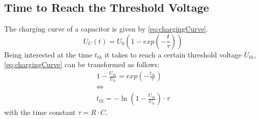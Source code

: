     \subsection{Time to Reach the Threshold Voltage}\label{sec:preparation_task_6}
        The charging curve of a capacitor is given by \cref{eq:chargingCurve}.
        \begin{equation}
            U_C(t) = U_0 \left(1-exp\left(-\frac{t}{\tau}\right)\right)
            \label{eq:chargingCurve}
        \end{equation}
        Being interested at the time \( t_{th} \) it takes to reach a certain threshold voltage \( U_{th} \), \cref{eq:chargingCurve}
        can be transformed as follows:
        \begin{gather}
            1- \frac{U_{th}}{U_0} = exp\left(-\frac{t_{th}}{\tau}\right) \nonumber \\
            \Leftrightarrow \nonumber \\
            t_{th} = - \ln\left(1- \frac{U_{th}}{U_0}\right) \cdot \tau
            \label{eq:timeToThresholfVoltage}
        \end{gather}
        with the time constant \( \tau = R \cdot C \).
